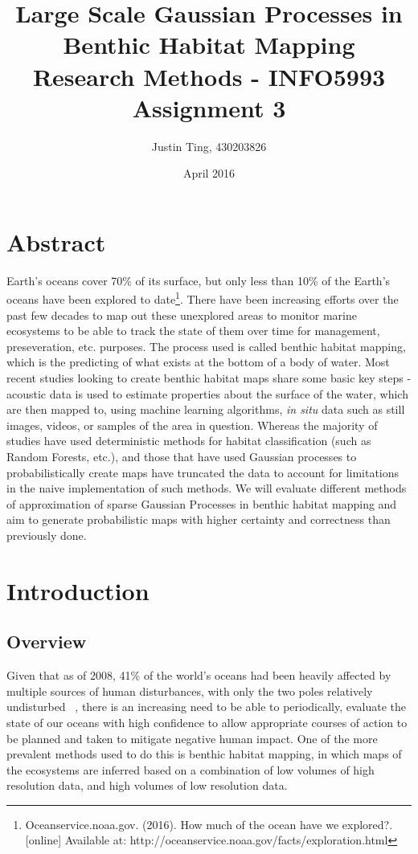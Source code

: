 \documentclass[10pt]{article}
\title{Large Scale Gaussian Processes in Benthic Habitat Mapping \\ Research Methods - INFO5993 Assignment 3}
\author{Justin Ting, 430203826}
\date{April 2016}
\begin{document}
\maketitle

\begin{multicols}{2}

    \section{Abstract}

    Earth's oceans cover 70\% of its surface, but only less than 10\% of the Earth's oceans have been explored to date\footnote{Oceanservice.noaa.gov. (2016). How much of the ocean have we explored?. [online] Available at: http://oceanservice.noaa.gov/facts/exploration.html}. There have been increasing efforts over the past few decades to map out these unexplored areas to monitor marine ecosystems to be able to track the state of them over time for management, preseveration, etc. purposes. The process used is called benthic habitat mapping, which is the predicting of what exists at the bottom of a body of water. Most recent studies looking to create benthic habitat maps share some basic key steps - acoustic data is used to estimate properties about the surface of the water, which are then mapped to, using machine learning algorithms, \textit{in situ} data such as still images, videos, or samples of the area in question. Whereas the majority of studies have used deterministic methods for habitat classification (such as Random Forests, etc.), and those that have used Gaussian processes to probabilistically create maps have truncated the data to account for limitations in the naive implementation of such methods. We will evaluate different methods of approximation of sparse Gaussian Processes in benthic habitat mapping and aim to generate probabilistic maps with higher certainty and correctness than previously done.

    \section{Introduction}

    \subsection{Overview}
    
    Given that as of 2008, 41\% of the world's oceans had been heavily affected by multiple sources of human disturbances, with only the two poles relatively undisturbed ~\citep{halpern08}, there is an increasing need to be able to periodically, evaluate the state of our oceans with high confidence to allow appropriate courses of action to be planned and taken to mitigate negative human impact. One of the more prevalent methods used to do this is benthic habitat mapping, in which maps of the ecosystems are inferred based on a combination of low volumes of high resolution data, and high volumes of low resolution data. 
    

\end{multicols}
\end{document}
